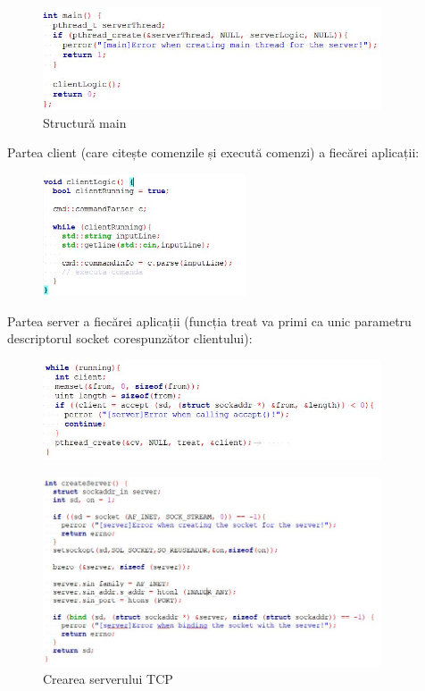 \documentclass[runningheads]{llncs}
\begin{document}
\begin{figure}[!h]
	\centering
	\includegraphics[width=10cm]{main.jpg}
	\caption{Structură main}
\end{figure}

Partea client (care citește comenzile și execută comenzi) a fiecărei aplicații:

\begin{figure}[!h]
	\centering
	\includegraphics[width=6cm]{client.jpg}
\end{figure}

Partea server a fiecărei aplicații (funcția treat va primi ca unic parametru descriptorul socket corespunzător clientului):

\begin{figure}[!h]
	\centering
	\includegraphics[width=10cm]{server.jpg}
\end{figure}

\begin{figure}[!h]
	\centering
	\includegraphics[width=10cm]{server-creation.jpg}
	\caption{Crearea serverului TCP}
\end{figure}
\end{document}
